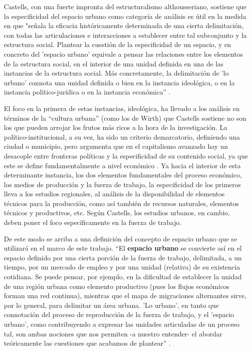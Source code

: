 Castells, con una fuerte impronta del estructuralismo althousseriano, sostiene que la especificidad del espacio urbano como categoría de análisis es útil en la medida en que  "señala la eficacia históricamente determinada de una cierta delimitación, con todas las articulaciones e interacciones a establecer entre tal subconjunto y la estructura social. Plantear la cuestión de la especificidad de un espacio, y en concreto del 'espacio urbano' equivale a pensar las relaciones entre los elementos de la estructura social, en el interior de una unidad definida en una de las instancias de la estructura social. Más concretamente, la delimitación de 'lo urbano' connota una unidad definida o bien en la instancia ideológica, o en la instancia político-jurídica o en la instancia económica” \cite[p.~277]{castells}.

El foco en la primera de estas instancias, ideológica, ha llevado a los análisis en términos de la “cultura urbana” (como los de Wirth) que Castells sostiene no son los que pueden arrojar los frutos más ricos a la hora de la investigación. La político-institucional, a su vez, ha sido un criterio demarcatorio, definiendo una ciudad o municipio, pero argumenta que en el capitalismo avanzado hay un desacople entre fronteras políticas y la especificidad de su contenido social, ya que este se define fundamentalmente a nivel económico \cite[~278]{castells}. Ya hacia el interior de esta determinante instancia, los dos elementos fundamentales del proceso económico, los medios de producción y la fuerza de trabajo, la especificidad de los primeros lleva a los estudios regionales, al análisis de la disponibilidad de elementos técnicos para la producción, como así también de recursos naturales, elementos técnicos y productivos, etc. Según Castells, los estudios urbanos, en cambio, deben poner el foco específicamente en la fuerza de trabajo. 

De este modo se arriba a una definición del concepto de espacio urbano que se utilizará en el marco de este trabajo. “El \textbf{espacio urbano} se convierte así en el espacio definido por una cierta porción de la fuerza de trabajo, delimitada, a un tiempo, por un mercado de empleo y por una unidad (relativa) de su existencia cotidiana. Se puede pensar, por ejemplo, en la dificultad de establecer la unidad de una región urbana como elemento productivo (pues los flujos económicos forman una red continua), mientras que el mapa de migraciones alternantes sirve, por lo general, para delimitar un área urbana. 'Lo urbano', en tanto que connotación del proceso de reproducción de la fuerza de trabajo, y el 'espacio urbano', como contribuyendo a expresar las unidades articuladas de un proceso tal, son ambas nociones que nos permiten -a nuestro entender- el abordar teóricamente las cuestiones que acabamos de plantear” \cite[~279]{castells}. 

